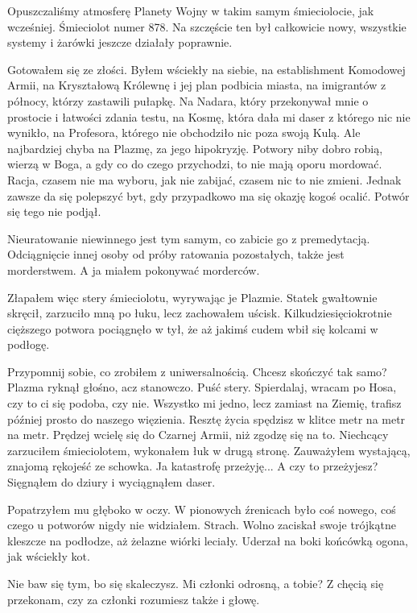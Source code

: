 Opuszczaliśmy atmosferę Planety Wojny w takim samym śmieciolocie, jak wcześniej. Śmieciolot numer 878.
Na szczęście ten był całkowicie nowy, wszystkie systemy i żarówki jeszcze działały poprawnie.

Gotowałem się ze złości. Byłem wściekły na siebie, na establishment Komodowej Armii, na Kryształową Królewnę i jej plan podbicia miasta, na imigrantów z północy, którzy zastawili pułapkę.
Na Nadara, który przekonywał mnie o prostocie i łatwości zdania testu, na Kosmę, która dała mi daser z którego nic nie wynikło, na Profesora, którego nie obchodziło nic poza swoją Kulą.
Ale najbardziej chyba na Plazmę, za jego hipokryzję. 
Potwory niby dobro robią, wierzą w Boga, a gdy co do czego przychodzi, to nie mają oporu mordować.
Racja, czasem nie ma wyboru, jak nie zabijać, czasem nic to nie zmieni. Jednak zawsze da się polepszyć byt, gdy przypadkowo ma się okazję kogoś ocalić.
Potwór się tego nie podjął. 

Nieuratowanie niewinnego jest tym samym, co zabicie go z premedytacją.
Odciągnięcie innej osoby od próby ratowania pozostałych, także jest morderstwem.
A ja miałem pokonywać morderców.

Złapałem więc stery śmieciolotu, wyrywając je Plazmie.
Statek gwałtownie skręcił, zarzuciło mną po łuku, lecz zachowałem uścisk.
Kilkudziesięciokrotnie cięższego potwora pociągnęło w tył, że aż jakimś cudem wbił się kolcami w podłogę.

\begin{dialogue}
\ds{} Przypomnij sobie, co zrobiłem z uniwersalnością. Chcesz skończyć tak samo? \dm{} Plazma ryknął głośno, acz stanowczo. \dm{} Puść stery.
\ds{} Spierdalaj, wracam po Hosa, czy to ci się podoba, czy nie.
\ds{} Wszystko mi jedno, lecz zamiast na Ziemię, trafisz później prosto do naszego więzienia. Resztę życia spędzisz w klitce metr na metr na metr.
\ds{} Prędzej wcielę się do Czarnej Armii, niż zgodzę się na to. \dm{} Niechcący zarzuciłem śmieciolotem, wykonałem łuk w drugą stronę. Zauważyłem wystającą, znajomą rękojeść ze schowka.
\ds{} Ja katastrofę przeżyję...
\ds{} A czy to przeżyjesz? \dm{} Sięgnąłem do dziury i wyciągnąłem daser. 
\end{dialogue}
Popatrzyłem mu głęboko w oczy. W pionowych źrenicach było coś nowego, coś czego u potworów nigdy nie widziałem. Strach.
Wolno zaciskał swoje trójkątne kleszcze na podłodze, aż żelazne wiórki leciały.
Uderzał na boki końcówką ogona, jak wściekły kot.

\begin{dialogue}
\ds{} Nie baw się tym, bo się skaleczysz. Mi członki odrosną, a tobie?
\ds{} Z chęcią się przekonam, czy za członki rozumiesz także i głowę.
\end{dialogue}

